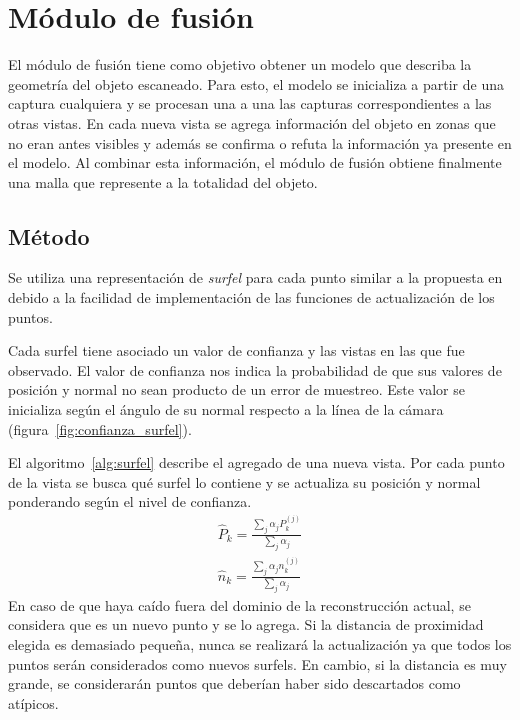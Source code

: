 \section{Módulo de fusión}
	El módulo de fusión tiene como objetivo obtener un modelo que
	describa la geometría del objeto escaneado.
	Para esto, el modelo se inicializa a partir de una captura cualquiera
	y se procesan una a una las capturas correspondientes a las otras vistas.
	En cada nueva vista se agrega información del objeto en zonas que no eran antes visibles
	y además se confirma o refuta la información ya presente en el modelo.
	Al combinar esta información, el módulo de fusión obtiene finalmente una malla
	que represente a la totalidad del objeto.

	\subsection{Método}
	Se utiliza una representación de \emph{surfel} para cada punto similar a la propuesta en \cite{5457479} %
	debido a la facilidad de implementación de las funciones de actualización de los puntos.

	Cada surfel tiene asociado un valor de confianza y las vistas en las que
	fue observado.  El valor de confianza nos indica la probabilidad de que sus
	valores de posición y normal no sean producto de un error de muestreo.
	Este valor se inicializa según el ángulo de su normal respecto a la línea
	de la cámara (figura~\ref{fig:confianza_surfel}).



	El algoritmo~\ref{alg:surfel} describe el agregado de una nueva vista.
	Por cada punto de la vista se busca qué surfel lo contiene y se actualiza
	su posición y normal ponderando según el nivel de confianza.
	\begin{eqnarray*}
		\hat{P}_k = \frac{\sum_{j} \alpha_j P^{(j)}_k}{\sum_{j} \alpha_j} \\
		\hat{n}_k = \frac{\sum_{j} \alpha_j n^{(j)}_k}{\sum_{j} \alpha_j}
	\end{eqnarray*}
	En caso de que haya caído fuera del dominio de la reconstrucción actual, se
	considera que es un nuevo punto y se lo agrega.
	Si la distancia de proximidad elegida es demasiado pequeña,
	nunca se realizará la actualización ya que todos los puntos serán considerados como nuevos surfels.
	En cambio, si la distancia es muy grande, se considerarán puntos
	que deberían haber sido descartados como atípicos.


